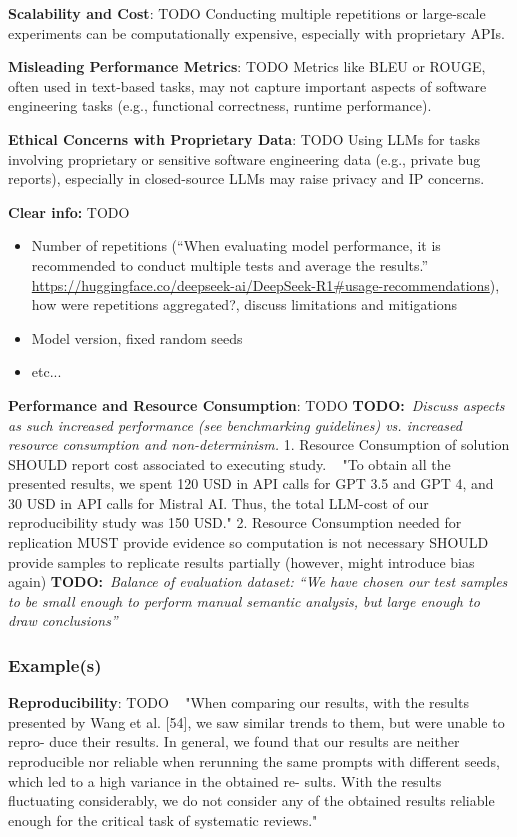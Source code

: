 \documentclass[11pt]{article}
\newcommand{\todo}[1]{{\textbf{TODO:}\ \textit{#1}}} %
\begin{document}
\textbf{Scalability and Cost}: TODO
Conducting multiple repetitions or large-scale experiments can be computationally expensive, especially with proprietary APIs.

\textbf{Misleading Performance Metrics}: TODO
Metrics like BLEU or ROUGE, often used in text-based tasks, may not capture important aspects of software engineering tasks (e.g., functional correctness, runtime performance).

\textbf{Ethical Concerns with Proprietary Data}: TODO
Using LLMs for tasks involving proprietary or sensitive software engineering data (e.g., private bug reports), especially in closed-source LLMs may raise privacy and IP concerns.

\textbf{Clear info:} TODO
\begin{itemize}
  \item Number of repetitions (``When evaluating model performance, it is recommended to conduct multiple tests and average the results.'' \url{https://huggingface.co/deepseek-ai/DeepSeek-R1\#usage-recommendations}), how were repetitions aggregated?, discuss limitations and mitigations
  \item Model version, fixed random seeds
  \item etc...
\end{itemize}

\textbf{Performance and Resource Consumption}: TODO
\todo{Discuss aspects as such increased performance (see benchmarking guidelines) vs. increased resource consumption and non-determinism.}
1. Resource Consumption of solution
SHOULD report cost associated to executing study. ~\cite{10.1145/3673791.3698432} "To obtain all the presented results, we spent 120 USD in API calls for GPT 3.5 and GPT 4, and 30 USD in API calls for Mistral AI. Thus, the total LLM-cost of our reproducibility study was 150 USD."
2. Resource Consumption needed for replication
MUST provide evidence so computation is not necessary
SHOULD provide samples to replicate results partially (however, might introduce bias again)
\todo{Balance of evaluation dataset: ``We have chosen our test samples to be small enough to perform manual semantic analysis, but large enough to draw conclusions''~\cite{tinnessoftware}}


\subsubsection{Example(s)}
\textbf{Reproducibility}: TODO
~\cite{10.1145/3673791.3698432} "When comparing our results, with the results presented by Wang et al. [54], we saw similar trends to them, but were unable to repro- duce their results. In general, we found that our results are neither reproducible nor reliable when rerunning the same prompts with different seeds, which led to a high variance in the obtained re- sults. With the results fluctuating considerably, we do not consider any of the obtained results reliable enough for the critical task of systematic reviews."
\end{document}

